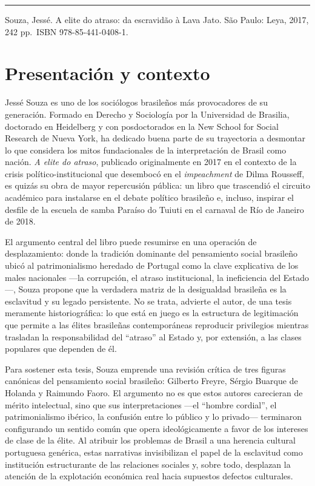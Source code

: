 \documentclass{article}
\renewcommand{\normalsize}{\fontsize{10pt}{13pt}\selectfont}
\renewenvironment{quote}{\normalsize\list{}{\sf\leftmargin=14pt\rightmargin=0pt}\item\relax}{\endlist}
\begin{document}
\bigskip
\noindent\rule{\linewidth}{0.4pt}
\bigskip


\begin{quote}
Souza, Jessé. A elite do atraso: da escravidão à Lava Jato. São Paulo: Leya, 2017, 242 pp. ISBN 978-85-441-0408-1.

\end{quote}

\section{Presentación y contexto}
Jessé Souza es uno de los sociólogos brasileños más provocadores de su generación. Formado en Derecho y Sociología por la Universidad de Brasilia, doctorado en Heidelberg y con posdoctorados en la New School for Social Research de Nueva York, ha dedicado buena parte de su trayectoria a desmontar lo que considera los mitos fundacionales de la interpretación de Brasil como nación. \textit{A elite do atraso}, publicado originalmente en 2017 en el contexto de la crisis político-institucional que desembocó en el \textit{impeachment} de Dilma Rousseff, es quizás su obra de mayor repercusión pública: un libro que trascendió el circuito académico para instalarse en el debate político brasileño e, incluso, inspirar el desfile de la escuela de samba Paraíso do Tuiuti en el carnaval de Río de Janeiro de 2018.

El argumento central del libro puede resumirse en una operación de desplazamiento: donde la tradición dominante del pensamiento social brasileño ubicó al patrimonialismo heredado de Portugal como la clave explicativa de los males nacionales —la corrupción, el atraso institucional, la ineficiencia del Estado—, Souza propone que la verdadera matriz de la desigualdad brasileña es la esclavitud y su legado persistente. No se trata, advierte el autor, de una tesis meramente historiográfica: lo que está en juego es la estructura de legitimación que permite a las élites brasileñas contemporáneas reproducir privilegios mientras trasladan la responsabilidad del “atraso” al Estado y, por extensión, a las clases populares que dependen de él.

Para sostener esta tesis, Souza emprende una revisión crítica de tres figuras canónicas del pensamiento social brasileño: Gilberto Freyre, Sérgio Buarque de Holanda y Raimundo Faoro. El argumento no es que estos autores carecieran de mérito intelectual, sino que sus interpretaciones —el “hombre cordial”, el patrimonialismo ibérico, la confusión entre lo público y lo privado— terminaron configurando un sentido común que opera ideológicamente a favor de los intereses de clase de la élite. Al atribuir los problemas de Brasil a una herencia cultural portuguesa genérica, estas narrativas invisibilizan el papel de la esclavitud como institución estructurante de las relaciones sociales y, sobre todo, desplazan la atención de la explotación económica real hacia supuestos defectos culturales.
\end{document}
